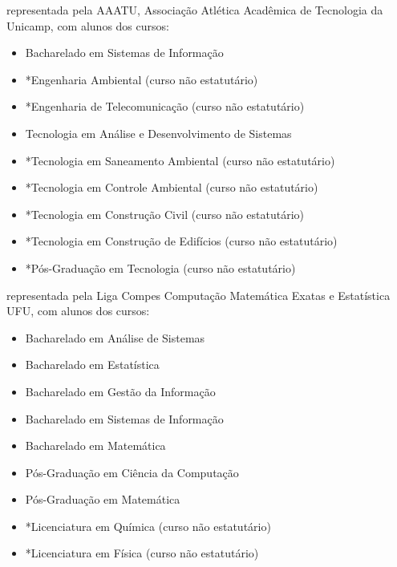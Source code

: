 \begin{article}
\begin{description}[noitemsep]
		\item[UNICAMP - Limeira] representada pela AAATU, Associação Atlética Acadêmica de Tecnologia da Unicamp, com alunos dos cursos:
		\begin{itemize}[noitemsep]
			\item Bacharelado em Sistemas de Informação
			\item *Engenharia Ambiental (curso não estatutário)
			\item *Engenharia de Telecomunicação (curso não estatutário)
			\item Tecnologia em Análise e Desenvolvimento de Sistemas
			\item *Tecnologia em Saneamento Ambiental (curso não estatutário)
			\item *Tecnologia em Controle Ambiental (curso não estatutário)
			\item *Tecnologia em Construção Civil (curso não estatutário)
			\item *Tecnologia em Construção de Edifícios (curso não estatutário)
			\item *Pós-Graduação em Tecnologia (curso não estatutário)
		\end{itemize}

		\item[UFU] representada pela Liga Compes Computação Matemática Exatas e Estatística UFU, com alunos dos cursos:
		\begin{itemize}[noitemsep]
			\item Bacharelado em Análise de Sistemas
			\item Bacharelado em Estatística
			\item Bacharelado em Gestão da Informação
			\item Bacharelado em Sistemas de Informação
			\item Bacharelado em Matemática
			\item Pós-Graduação em Ciência da Computação
			\item Pós-Graduação em Matemática
			\item *Licenciatura em Química (curso não estatutário)
			\item *Licenciatura em Física (curso não estatutário)
		\end{itemize}

	\end{description}
\end{article} 
